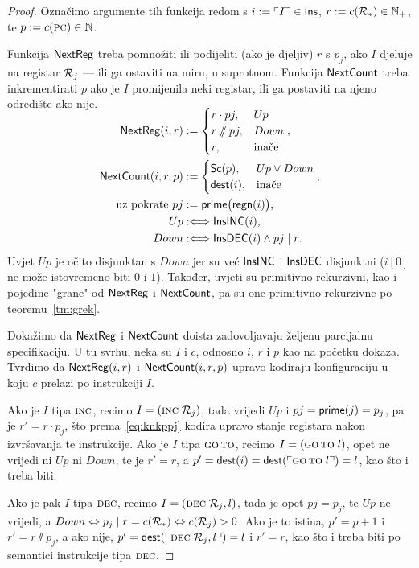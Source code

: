 \begin{proof}
Označimo argumente tih funkcija redom s $i:=\ulcorner I\urcorner\in\mathsf{Ins}$, $r:=c(\mathcal R_{*})\in{\mathbb N}_+$, te $p:=c(\textsc{pc})\in{\mathbb N}$.

Funkcija $\mathsf{NextReg}$ treba pomnožiti ili podijeliti (ako je djeljiv) $r$ s $p_j$, ako $I$ djeluje na registar $\mathcal R_{j}$ --- ili ga ostaviti na miru, u suprotnom. Funkcija $\mathsf{NextCount}$ treba inkrementirati $p$ ako je $I$ promijenila neki registar, ili ga postaviti na njeno odredište ako nije.
\begin{align}
\SwapAboveDisplaySkip
    \label{eq:NextRegdef}\f{NextReg}(i,r)&:=\begin{cases}
    r\cdot pj,&Up\\
    r\sslash pj,&Down\\
    r,&\text{inače}
    \end{cases}\text,
\\
    \f{NextCount}(i,r,p)&:=\begin{cases}
    \f{Sc}(p),&Up\lor Down\\
    \f{dest}(i),&\text{inače}
    \end{cases}\text,
\\
\text{uz pokrate }
pj&:=\f{prime}\bigl(\f{regn}(i)\bigr)\text,\\
Up&:\Longleftrightarrow\f{InsINC}(i)\text,\\
Down&:\Longleftrightarrow\f{InsDEC}(i)\land pj\mid r\text.
\end{align}
Uvjet $Up$ je očito disjunktan s $Down$ jer su već $\mathsf{InsINC}$ i $\mathsf{InsDEC}$ disjunktni ($i[0]$ ne može istovremeno biti $0$ i $1$). Također, uvjeti su primitivno rekurzivni, kao i pojedine "grane" od $\mathsf{NextReg}$ i $\mathsf{NextCount}$, pa su one primitivno rekurzivne po teoremu~\ref{tm:grek}.

Dokažimo da $\mathsf{NextReg}$ i $\mathsf{NextCount}$ doista zadovoljavaju željenu parcijalnu specifikaciju. U tu svrhu, neka su $I$ i $c$, odnosno $i$, $r$ i $p$ kao na početku dokaza. Tvrdimo da $\mathsf{NextReg}(i,r)$ i $\mathsf{NextCount}(i,r,p)$ upravo kodiraju konfiguraciju u koju $c$ prelazi po instrukciji $I$.

Ako je $I$ tipa $\textsc{inc}$, recimo $I=(\textsc{inc}\;\mathcal R_{j})$, tada vrijedi $Up$ i $pj=\mathsf{prime}(j)=p_j$, pa je $r'=r\cdot p_j$, što prema~\eqref{eq:knkppj} kodira upravo stanje registara nakon izvršavanja te instrukcije. Ako je $I$ tipa $\textsc{go\,to}$, recimo $I=(\textsc{go\,to}\;l)$, opet ne vrijedi ni $Up$ ni $Down$, te je $r'=r$, a $p'=\mathsf{dest}(i)=\mathsf{dest}(\ulcorner\textsc{go\,to}\;l\urcorner)=l$, kao što i treba biti.

Ako je pak $I$ tipa $\textsc{dec}$, recimo $I=(\textsc{dec}\;\mathcal R_{j},l)$, tada je opet $pj=p_j$, te $Up$ ne vrijedi, a $Down\Leftrightarrow p_j\mid r=c(\mathcal R_{*})\Leftrightarrow c(\mathcal R_{j})>0$. Ako je to istina, $p'=p+1$ i $r'=r\sslash p_j$, a ako nije, $p'=\mathsf{dest}(\ulcorner\textsc{dec}\;\mathcal R_{j},l\urcorner)=l$ i $r'=r$, kao što i treba biti po semantici instrukcije tipa $\textsc{dec}$.
\end{proof}

